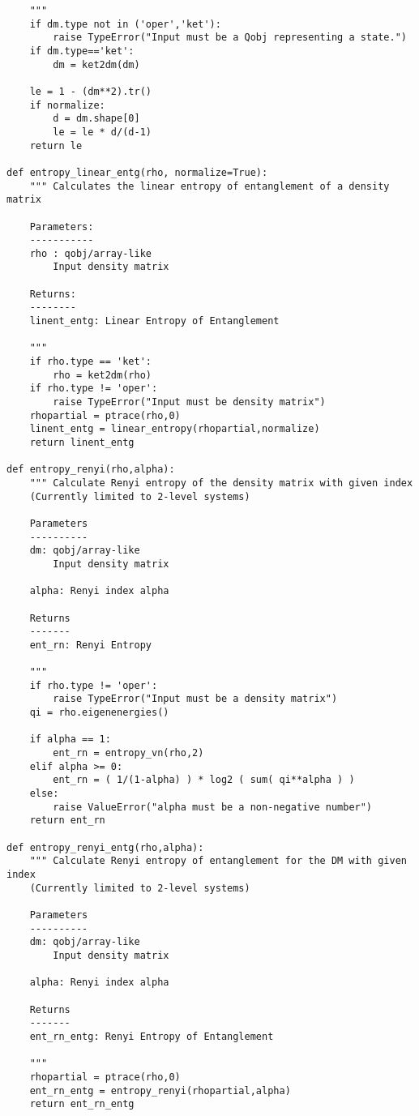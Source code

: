 \begin{verbatim}
    """
    if dm.type not in ('oper','ket'):
        raise TypeError("Input must be a Qobj representing a state.")
    if dm.type=='ket':
        dm = ket2dm(dm)
    
    le = 1 - (dm**2).tr()
    if normalize:
        d = dm.shape[0]
        le = le * d/(d-1)
    return le

def entropy_linear_entg(rho, normalize=True):
    """ Calculates the linear entropy of entanglement of a density matrix
    
    Parameters:
    -----------
    rho : qobj/array-like
        Input density matrix
    
    Returns:
    --------
    linent_entg: Linear Entropy of Entanglement
    
    """
    if rho.type == 'ket':
        rho = ket2dm(rho)
    if rho.type != 'oper':
        raise TypeError("Input must be density matrix")
    rhopartial = ptrace(rho,0)
    linent_entg = linear_entropy(rhopartial,normalize)
    return linent_entg

def entropy_renyi(rho,alpha):
    """ Calculate Renyi entropy of the density matrix with given index
    (Currently limited to 2-level systems)
    
    Parameters
    ----------
    dm: qobj/array-like
        Input density matrix
        
    alpha: Renyi index alpha
    
    Returns
    -------
    ent_rn: Renyi Entropy
    
    """
    if rho.type != 'oper':
        raise TypeError("Input must be a density matrix")
    qi = rho.eigenenergies()
    
    if alpha == 1:
        ent_rn = entropy_vn(rho,2)
    elif alpha >= 0:
        ent_rn = ( 1/(1-alpha) ) * log2 ( sum( qi**alpha ) )
    else:
        raise ValueError("alpha must be a non-negative number")
    return ent_rn

def entropy_renyi_entg(rho,alpha):
    """ Calculate Renyi entropy of entanglement for the DM with given index
    (Currently limited to 2-level systems)
    
    Parameters
    ----------
    dm: qobj/array-like
        Input density matrix
        
    alpha: Renyi index alpha
    
    Returns
    -------
    ent_rn_entg: Renyi Entropy of Entanglement
    
    """
    rhopartial = ptrace(rho,0)
    ent_rn_entg = entropy_renyi(rhopartial,alpha)
    return ent_rn_entg


\end{verbatim}
